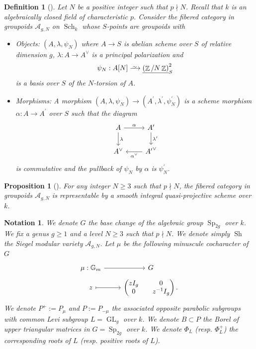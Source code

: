 \documentclass[11pt]{amsart}
\numberwithin{subsection}{section}
\numberwithin{figure}{section}
\numberwithin{table}{section}
\theoremstyle{1}
\newtheorem{proposition}[theorem]{Proposition}
\newtheorem{definition}[theorem]{Definition}
\theoremstyle{2}
\newtheorem{notation}[theorem]{Notation}
\DeclareMathOperator{\Z}{\mathbb{Z}}
\DeclareMathOperator{\Sch}{Sch}
\DeclareMathOperator{\GL}{GL}
\DeclareMathOperator{\Sp}{Sp}
\DeclareMathOperator{\Sh}{Sh}
\newcommand{\DistTo}{\xrightarrow{
   \,\smash{\raisebox{-0.65ex}{\ensuremath{\scriptstyle\sim}}}\,}}
\begin{document}
\begin{definition}[\cite{MR1083353}]
Let $N$ be a positive integer such that $p \nmid N$. Recall that $k$ is an algebraically closed field of characteristic $p$. Consider the fibered category in groupoids $\mathcal{A}_{g,N}$ on $\Sch_{k}$ whose $S$-points are groupoids with
\begin{itemize}
\item Objects: $(A,\lambda,\psi_N)$ where $A \rightarrow S$ is abelian scheme over $S$ of relative dimension $g$, $\lambda : A \rightarrow A^{\vee}$ is a principal polarization and
\begin{equation*}
\psi_N : A[N] \DistTo \underline{\left(\Z/N\Z\right)}_S^2
\end{equation*}
is a basis over $S$ of the $N$-torsion of $A$.
\item Morphisms: A morphism $(A,\lambda,\psi_N) \rightarrow (A^\prime,\lambda^\prime,\psi^\prime_N)$ is a scheme morphism $\alpha : A \rightarrow A^\prime$ over $S$ such that the diagram
\begin{equation*}
\begin{tikzcd}
A \arrow[r,"\alpha"] \arrow[d,"\lambda"] & A^{\prime} \arrow[d,"\lambda^\prime"] \\
A^{\vee} & {A^\prime}^{\vee} \arrow[l,"\alpha^{\vee}"]
\end{tikzcd}
\end{equation*}
is commutative and the pullback of $\psi_N$ by $\alpha$ is $\psi^\prime_N$.
\end{itemize}
\end{definition}
\begin{proposition}[\cite{MR1083353}]\label{prop1_sieg}
For any integer $N \geq 3$ such that $p \nmid N$, the fibered category in groupoids $\mathcal{A}_{g,N}$ is representable by a smooth integral quasi-projective scheme over $k$.
\end{proposition}
\begin{notation}\label{not1}
We denote $G$ the base change of the algebraic group $\Sp_{2g}$ over $k$. We fix a genus $g \geq 1$ and a level $N \geq 3$ such that $p \nmid N$. We denote simply $\Sh$ the Siegel modular variety $\mathcal{A}_{g,N}$. Let $\mu$ be the following minuscule cocharacter of $G$
\begin{equation*}
\begin{tikzcd}[row sep =tiny]
\mu : \mathbb{G}_m \arrow[r] & G \\
z \arrow[r,mapsto] &\begin{pmatrix}
zI_g & 0 \\ 0 & z^{-1}I_g
\end{pmatrix}.
\end{tikzcd}
\end{equation*}
We denote $P^+ := P_{\mu}$ and $P:=P_{-\mu}$ the associated opposite parabolic subgroups with common Levi subgroup $L = \GL_g$ over $k$. We denote $B \subset P$ the Borel of upper triangular matrices in $G = \Sp_{2g}$ over $k$. We denote $\Phi_L$ (resp. $\Phi_L^+$) the corresponding roots of $L$ (resp. positive roots of $L$).
\end{notation}
\end{document}
